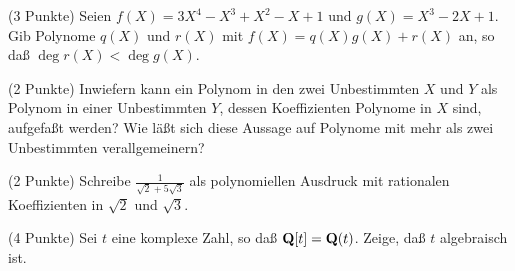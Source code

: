 \documentclass{algsheet}
\begin{document}
\begin{exercise}(3 Punkte)\newline
    Seien \(f(X) = 3 X^4 - X^3 + X^2 - X + 1\) und \(g(X) = X^3 - 2 X + 1\).
    Gib Polynome \(q(X)\) und \(r(X)\) mit \(f(X) = q(X) g(X) + r(X)\) an, so
    daß \(\deg r(X) < \deg g(X)\).
\end{exercise}

\begin{exercise}(2 Punkte)\newline
    Inwiefern kann ein Polynom in den zwei Unbestimmten \(X\) und \(Y\) als
    Polynom in einer Unbestimmten \(Y\), dessen Koeffizienten Polynome in
    \(X\) sind, aufgefaßt werden?    
    Wie läßt sich diese Aussage auf Polynome mit mehr als zwei Unbestimmten
    verallgemeinern?
\end{exercise}

\begin{exercise}(2 Punkte)\newline
    Schreibe \(\frac 1 {\sqrt 2 + 5 \sqrt 3}\) als polynomiellen Ausdruck
    mit rationalen Koeffizienten in \(\sqrt 2\) und \(\sqrt 3\).
\end{exercise}

\begin{exercise}(4 Punkte)\newline
    Sei \(t\) eine komplexe Zahl, so daß \(\mathbf Q[t] = \mathbf Q(t)\). Zeige, daß
    \(t\) algebraisch ist.
\end{exercise}
\end{document}

